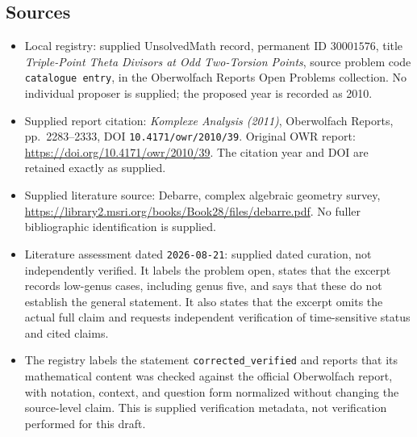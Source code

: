 \documentclass[11pt]{article}
\begin{document}
\subsection{Sources}
\begin{itemize}
\item Local registry: supplied UnsolvedMath record, permanent ID \(30001576\), title \emph{Triple-Point Theta Divisors at Odd Two-Torsion Points}, source problem code \texttt{catalogue entry}, in the Oberwolfach Reports Open Problems collection. No individual proposer is supplied; the proposed year is recorded as 2010.
\item Supplied report citation: \emph{Komplexe Analysis (2011)}, Oberwolfach Reports, pp.\ 2283--2333, DOI \texttt{10.4171/owr/2010/39}. Original OWR report: \url{https://doi.org/10.4171/owr/2010/39}. The citation year and DOI are retained exactly as supplied.
\item Supplied literature source: Debarre, complex algebraic geometry survey, \url{https://library2.msri.org/books/Book28/files/debarre.pdf}. No fuller bibliographic identification is supplied.
\item Literature assessment dated \texttt{2026-08-21}: supplied dated curation, not independently verified. It labels the problem open, states that the excerpt records low-genus cases, including genus five, and says that these do not establish the general statement. It also states that the excerpt omits the actual full claim and requests independent verification of time-sensitive status and cited claims.
\item The registry labels the statement \texttt{corrected\_verified} and reports that its mathematical content was checked against the official Oberwolfach report, with notation, context, and question form normalized without changing the source-level claim. This is supplied verification metadata, not verification performed for this draft.
\end{itemize}
\end{document}
